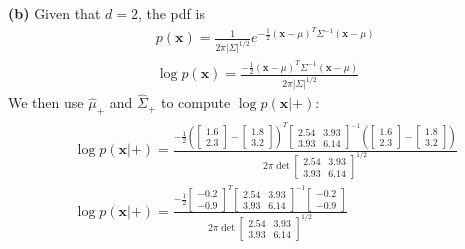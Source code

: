 \documentclass[leqno]{article}
\begin{document}
\noindent \textbf{(b)} Given that $d = 2$, the pdf is
\begin{equation*}
\begin{split}
&p(\textbf{x}) = \frac{1}{2\pi|\Sigma|^{1/2}}e^{-\frac{1}{2}(\textbf{x} - \mu)^T\Sigma^{-1}(\textbf{x} - \mu)}\\
&\log p(\textbf{x}) = \frac{-\frac{1}{2}(\textbf{x} - \mu)^T\Sigma^{-1}(\textbf{x} - \mu)}{2\pi|\Sigma|^{1/2}} 
\end{split}
\end{equation*}
We then use $\hat{\mu}_+$ and $\hat{\Sigma}_+$ to compute $\log p(\textbf{x}|+)$:
\begin{gather*}
\begin{split}
&\log p(\textbf{x}|+) = 
\frac{-\frac{1}{2}(\begin{bmatrix}
   1.6\\
   2.3 
\end{bmatrix} - \begin{bmatrix}
   1.8\\
   3.2 
\end{bmatrix})^T\begin{bmatrix}
   2.54 & 3.93\\
   3.93 & 6.14 
\end{bmatrix}^{-1}(\begin{bmatrix}
   1.6\\
   2.3 
\end{bmatrix} - \begin{bmatrix}
   1.8\\
   3.2 
\end{bmatrix})}{2\pi\det{\begin{bmatrix}
   2.54 & 3.93\\
   3.93 & 6.14 
\end{bmatrix}}^{1/2}}\\
&\log p(\textbf{x}|+) = 
\frac{-\frac{1}{2}\begin{bmatrix}
   -0.2\\
   -0.9 
\end{bmatrix}^T\begin{bmatrix}
   2.54 & 3.93\\
   3.93 & 6.14 
\end{bmatrix}^{-1}\begin{bmatrix}
   -0.2\\
   -0.9 
\end{bmatrix}}{2\pi\det{\begin{bmatrix}
   2.54 & 3.93\\
   3.93 & 6.14 
\end{bmatrix}}^{1/2}}\\

\end{split}
\end{gather*}
\end{document}
